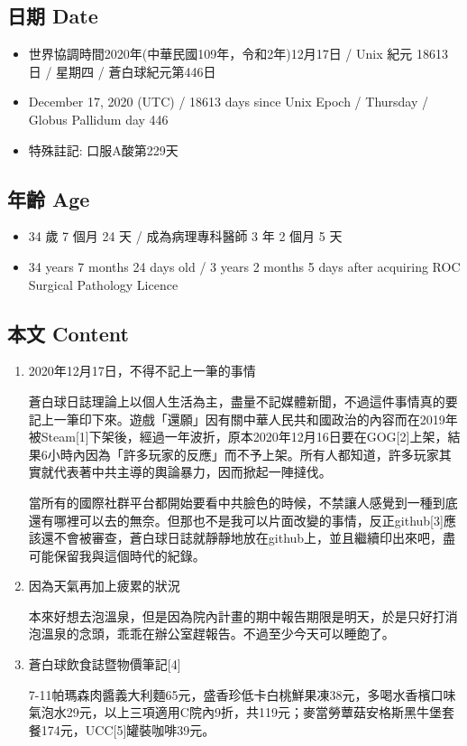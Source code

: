 \documentclass[a5paper, 11pt
]{book}
\providecommand{\tightlist}{%
  \setlength{\itemsep}{0pt}\setlength{\parskip}{0pt}}
\begin{document}
\hypertarget{ux65e5ux671f-date-16}{%
\subsection{日期 Date}\label{ux65e5ux671f-date-16}}

\begin{itemize}
\tightlist
\item
  世界協調時間2020年(中華民國109年，令和2年)12月17日 / Unix 紀元 18613
  日 / 星期四 / 蒼白球紀元第446日
\item
  December 17, 2020 (UTC) / 18613 days since Unix Epoch / Thursday /
  Globus Pallidum day 446
\item
  特殊註記: 口服A酸第229天
\end{itemize}

\hypertarget{ux5e74ux9f61-age-16}{%
\subsection{年齡 Age}\label{ux5e74ux9f61-age-16}}

\begin{itemize}
\tightlist
\item
  34 歲 7 個月 24 天 / 成為病理專科醫師 3 年 2 個月 5 天
\item
  34 years 7 months 24 days old / 3 years 2 months 5 days after
  acquiring ROC Surgical Pathology Licence
\end{itemize}

\hypertarget{ux672cux6587-content-16}{%
\subsection{本文 Content}\label{ux672cux6587-content-16}}

\begin{enumerate}
\def\labelenumi{\arabic{enumi}.}
\item
  2020年12月17日，不得不記上一筆的事情

  蒼白球日誌理論上以個人生活為主，盡量不記媒體新聞，不過這件事情真的要記上一筆印下來。遊戲「還願」因有關中華人民共和國政治的內容而在2019年被Steam{[}1{]}下架後，經過一年波折，原本2020年12月16日要在GOG{[}2{]}上架，結果6小時內因為「許多玩家的反應」而不予上架。所有人都知道，許多玩家其實就代表著中共主導的輿論暴力，因而掀起一陣撻伐。

  當所有的國際社群平台都開始要看中共臉色的時候，不禁讓人感覺到一種到底還有哪裡可以去的無奈。但那也不是我可以片面改變的事情，反正github{[}3{]}應該還不會被審查，蒼白球日誌就靜靜地放在github上，並且繼續印出來吧，盡可能保留我與這個時代的紀錄。
\item
  因為天氣再加上疲累的狀況

  本來好想去泡溫泉，但是因為院內計畫的期中報告期限是明天，於是只好打消泡溫泉的念頭，乖乖在辦公室趕報告。不過至少今天可以睡飽了。
\item
  蒼白球飲食誌暨物價筆記{[}4{]}

  7-11帕瑪森肉醬義大利麵65元，盛香珍低卡白桃鮮果凍38元，多喝水香檳口味氣泡水29元，以上三項適用C院內9折，共119元；麥當勞蕈菇安格斯黑牛堡套餐174元，UCC{[}5{]}罐裝咖啡39元。
\end{enumerate}
\end{document}
